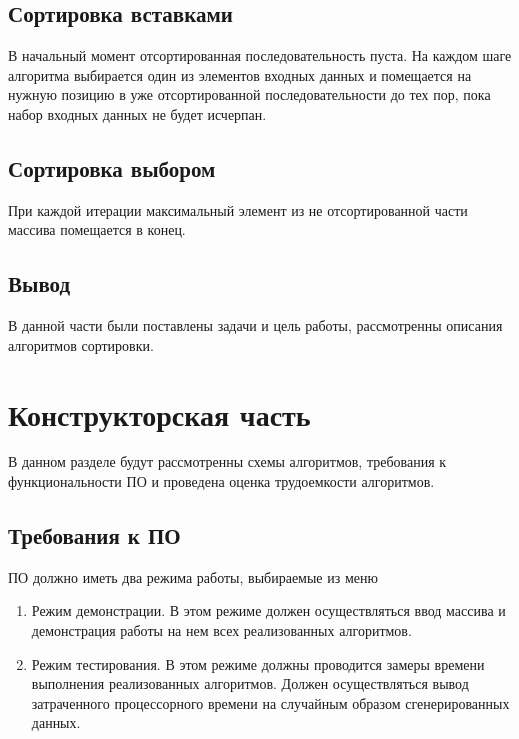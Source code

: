 \documentclass{article}
\begin{document}
		\subsection{Сортировка вставками}
		В начальный момент отсортированная последовательность пуста. На каждом шаге алгоритма 
		выбирается один из элементов входных данных и помещается на нужную позицию 
		в уже отсортированной последовательности до тех пор, пока набор входных данных не будет исчерпан.\cite{baseSort}
		\subsection{Сортировка выбором}
		При каждой итерации максимальный элемент из не отсортированной части массива помещается в конец.\cite{baseSort}
	\subsection{Вывод}
	В данной части были поставлены задачи и цель работы, рассмотренны описания алгоритмов сортировки.
		
	\newpage
	\section{Конструкторская часть}
		В данном разделе будут рассмотренны схемы алгоритмов, требования к функциональности ПО и проведена оценка трудоемкости алгоритмов.
		\subsection{Требования к ПО} 
		ПО должно иметь два режима работы, выбираемые из меню
		\begin{enumerate}
			\item Режим демонстрации. В этом режиме должен осуществляться ввод массива и демонстрация работы на нем всех реализованных алгоритмов.
		 	\item Режим тестирования. В этом режиме должны проводится замеры времени выполнения реализованных алгоритмов. Должен осуществляться вывод затраченного процессорного времени на случайным образом сгенерированных данных.
	 	\end{enumerate}
	 	
\end{document}
